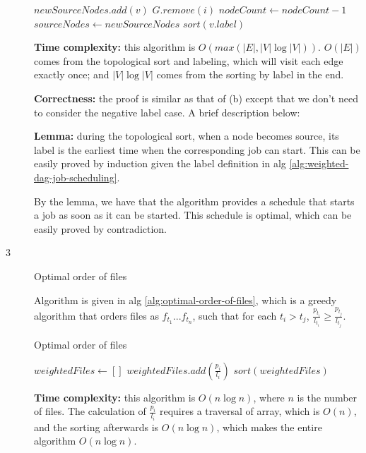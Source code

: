 \documentclass{article}
\begin{document}
\begin{description}
\begin{algorithm}[h]
\begin{algorithmic}[1]
              \State $newSourceNodes.add(v)$
            \EndIf
          \EndFor
          \State $G.remove(i)$
          \State $nodeCount \gets nodeCount - 1$
        \EndFor
        \State $sourceNodes \gets newSourceNodes$
      \EndWhile
      \State \Return $sort(v.label)$
    \EndFunction
    
    \end{algorithmic}
  \end{algorithm}

  \textbf{Time complexity:} this algorithm is $O(max(|E|, |V| \log |V|))$. $O(|E|)$ comes from the topological sort and labeling, which will visit each edge exactly once; and $|V| \log |V|$ comes from the sorting by label in the end.

  \textbf{Correctness:} the proof is similar as that of (b) except that we don't need to consider the negative label case. A brief description below:

  \textbf{Lemma:} during the topological sort, when a node becomes source, its label is the earliest time when the corresponding job can start. This can be easily proved by induction given the label definition in alg \ref{alg:weighted-dag-job-scheduling}.

  By the lemma, we have that the algorithm provides a schedule that starts a job as soon as it can be started. This schedule is optimal, which can be easily proved by contradiction.

\item[3]{Optimal order of files}
  
  Algorithm is given in alg \ref{alg:optimal-order-of-files}, which is a greedy algorithm that orders files as $f_{t_1}...f_{t_n}$, such that for each $t_i > t_j$, $\frac{p_{t_i}}{l_{t_i}} \geq \frac{p_{t_j}}{l_{t_j}}$.

  \begin{algorithm}[h]
  \caption{Optimal order of files}
  \label{alg:optimal-order-of-files}
    \begin{algorithmic}[1]
  
      \State $weightedFiles \gets []$
        \State $weightedFiles.add(\frac{p_i}{l_i})$
      \EndFor
      \State \Return $sort(weightedFiles)$
    \EndFunction
    
    \end{algorithmic}
  \end{algorithm}

  \textbf{Time complexity:} this algorithm is $O(n \log n)$, where $n$ is the number of files. The calculation of $\frac{p_i}{l_i}$ requires a traversal of array, which is $O(n)$, and the sorting afterwards is $O(n \log n)$, which makes the entire algorithm $O(n \log n)$.


\end{description}
\end{document}
